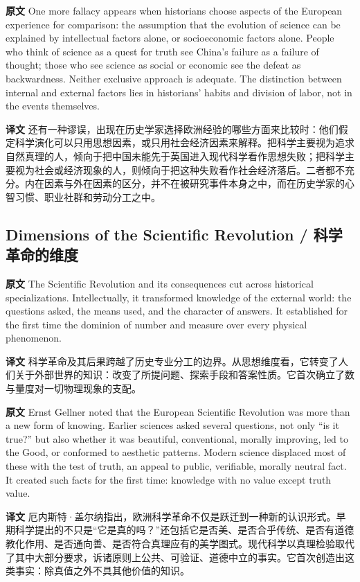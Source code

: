 \documentclass[UTF8,zihao=-4]{ctexart}
\newcommand{\BodyFont}{\fontsize{10.5pt}{15.5pt}\selectfont}
\newcommand{\origlabel}{\textbf{原文}\quad}
\newcommand{\translabel}{\textbf{译文}\quad}
\newenvironment{enblock}{\par\noindent\begingroup\BodyFont\origlabel}{\par\endgroup}
\newenvironment{zhblock}{\par\noindent\begingroup\BodyFont\translabel}{\par\endgroup\vspace{0.35em}}
\begin{document}
\begin{enblock}
One more fallacy appears when historians choose aspects of the European experience for comparison: the assumption that the evolution of science can be explained by intellectual factors alone, or socioeconomic factors alone. People who think of science as a quest for truth see China's failure as a failure of thought; those who see science as social or economic see the defeat as backwardness. Neither exclusive approach is adequate. The distinction between internal and external factors lies in historians' habits and division of labor, not in the events themselves.
\end{enblock}
\begin{zhblock}
还有一种谬误，出现在历史学家选择欧洲经验的哪些方面来比较时：他们假定科学演化可以只用思想因素，或只用社会经济因素来解释。把科学主要视为追求自然真理的人，倾向于把中国未能先于英国进入现代科学看作思想失败；把科学主要视为社会或经济现象的人，则倾向于把这种失败看作社会经济落后。二者都不充分。内在因素与外在因素的区分，并不在被研究事件本身之中，而在历史学家的心智习惯、职业社群和劳动分工之中。
\end{zhblock}

\subsection*{Dimensions of the Scientific Revolution / 科学革命的维度}

\begin{enblock}
The Scientific Revolution and its consequences cut across historical specializations. Intellectually, it transformed knowledge of the external world: the questions asked, the means used, and the character of answers. It established for the first time the dominion of number and measure over every physical phenomenon.
\end{enblock}
\begin{zhblock}
科学革命及其后果跨越了历史专业分工的边界。从思想维度看，它转变了人们关于外部世界的知识：改变了所提问题、探索手段和答案性质。它首次确立了数与量度对一切物理现象的支配。
\end{zhblock}

\begin{enblock}
Ernst Gellner noted that the European Scientific Revolution was more than a new form of knowing. Earlier sciences asked several questions, not only ``is it true?'' but also whether it was beautiful, conventional, morally improving, led to the Good, or conformed to aesthetic patterns. Modern science displaced most of these with the test of truth, an appeal to public, verifiable, morally neutral fact. It created such facts for the first time: knowledge with no value except truth value.
\end{enblock}
\begin{zhblock}
厄内斯特·盖尔纳指出，欧洲科学革命不仅是跃迁到一种新的认识形式。早期科学提出的不只是“它是真的吗？”还包括它是否美、是否合乎传统、是否有道德教化作用、是否通向善、是否符合真理应有的美学图式。现代科学以真理检验取代了其中大部分要求，诉诸原则上公共、可验证、道德中立的事实。它首次创造出这类事实：除真值之外不具其他价值的知识。
\end{zhblock}
\end{document}
